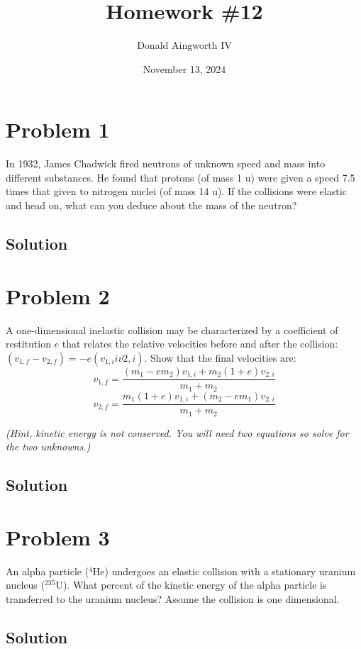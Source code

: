 \documentclass[12pt]{article}
\title{Homework \#12}
\author{Donald Aingworth IV}
\date{November 13, 2024}
\begin{document}

\maketitle

\pagebreak

\section*{Problem 1}
In 1932, James Chadwick fired neutrons of unknown speed and mass into different
substances. He found that protons (of mass 1 u) were given a speed 7.5 times that given to
nitrogen nuclei (of mass 14 u). If the collisions were elastic and head on, what can you deduce
about the mass of the neutron?

\subsection*{Solution}


\pagebreak
\section*{Problem 2}
A one-dimensional inelastic collision may be characterized by a coefficient of restitution $e$ that relates the relative velocities before and after the collision: $(v_{1,f} - v_{2,f}) = -e(v_{1,i} i v{2,i})$. Show that the final velocities are:
\[ v_{1,f} = \frac{(m_1 - em_2)v_{1,i} + m_2(1 + e)v_{2,i}}{m_1 + m_2} \]
\[ v_{2,f} = \frac{m_1(1 + e)v_{1,i} + (m_2 - em_1)v_{2,i}}{m_1 + m_2} \]

\textit{(Hint, kinetic energy is not conserved. You will need two equations so solve for the two
unknowns.)}
\subsection*{Solution}


\pagebreak
\section*{Problem 3}
An alpha particle ($^4$He) undergoes an elastic collision with a stationary uranium nucleus ($^{235}$U). What
percent of the kinetic energy of the alpha particle is transferred to the uranium nucleus? Assume the
collision is one dimensional.

\subsection*{Solution}
\end{document}
